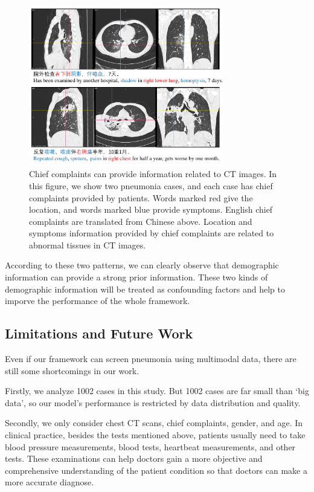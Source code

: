 \documentclass[journal]{IEEEtran}
\begin{document}
\begin{figure}[t]
    \centerline{\includegraphics[width=85mm]{txtpic.pdf}}
    \vspace{-0cm}
    \caption{Chief complaints can provide information related to CT images. In this figure, we show two pneumonia cases, and each case has chief complaints provided by patients. Words marked red give the location, and words marked blue provide symptoms. English chief complaints are translated from Chinese above. Location and symptoms information provided by chief complaints are related to abnormal tissues in CT images.}
    \vspace{-0cm}
    \label{txtpic}
    \end{figure}


According to these two patterns, we can clearly observe that demographic information can provide a strong prior information. These two kinds of demographic information will be treated as confounding factors and help to imporve the performance of the whole framework.

\subsection{Limitations and Future Work}
Even if our framework can screen pneumonia using multimodal data, there are still some shortcomings in our work.

Firstly, we analyze 1002 cases in this study. But 1002 cases are far small than `big data', so our model's performance is restricted by data distribution and quality. 

Secondly, we only consider chest CT scans, chief complaints, gender, and age. In clinical practice, besides the tests mentioned above, patients usually need to take blood pressure measurements, blood tests, heartbeat measurements, and other tests. These examinations can help doctors gain a more objective and comprehensive understanding of the patient condition so that doctors can make a more accurate diagnose.
\end{document}
